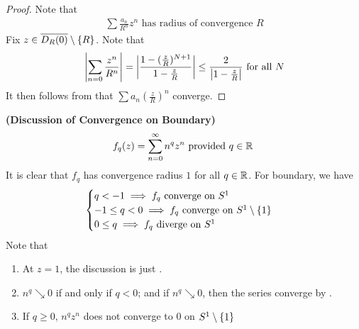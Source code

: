\documentclass{report}
\begin{document}
\begin{proof}
Note that 
\begin{align*}
\sum \frac{a_n}{R^n}z^n\text{ has radius of convergence }R
\end{align*}
Fix $z\in \overline{D_R(0)}\setminus \left\{ R \right\}$. Note that 
\begin{align*}
\left|\sum_{n=0}\frac{z^n}{R^n}\right|= \left|\frac{1-(\frac{z}{R})^{N+1}}{1-\frac{z}{R}}\right| \leq \frac{2}{\left|1-\frac{z}{R}\right|}\text{ for all }N
\end{align*}
It then follows from   that $\sum a_n (\frac{z}{R})^n$ converge.
\end{proof}
\begin{Example}{\textbf{(Discussion of Convergence on Boundary)}}{}
\begin{align*}
f_q(z)=\sum_{n=0}^\infty n^q z^n \text{ provided $q\in\mathbb{R}$ }
\end{align*}
It is clear that  $f_q$ has convergence radius  $1$ for all  $q\in\mathbb{R}$. For boundary, we have
\begin{align*}
\begin{cases}
  q<-1 \implies f_q\text{ converge on $S^1$ }\\
  -1\leq q<0 \implies f_q\text{ converge on }S^1\setminus \left\{ 1 \right\}\\
  0 \leq q \implies f_q \text{ diverge on }S^1
\end{cases}
\end{align*}
Note that
\begin{enumerate}[label=(\alph*)]
  \item At $z=1$, the discussion is just .  
  \item $n^q\searrow 0$ if and only if  $q<0$; and if  $n^q\searrow 0$, then the series converge by  . 
  \item If $q\geq 0$, $n^qz^n$ does not converge to  $0$ on  $S^1\setminus \left\{ 1 \right\}$
\end{enumerate}
\end{Example}
\end{document}
